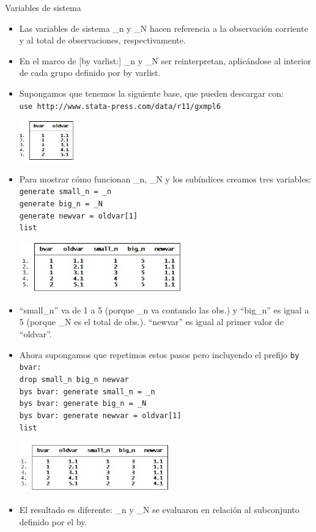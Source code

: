 \documentclass{beamer}
\begin{document}
\begin{frame}[allowframebreaks]{Variables de sistema}
\begin{itemize}
\item Las variables de sistema \_n y \_N hacen referencia a la observación corriente y al total de observaciones, respectivamente.
\item En el marco de [by varlist:] \_n y \_N ser reinterpretan, aplicándose al interior de cada grupo definido por by varlist.
\item Supongamos que tenemos la siguiente base, que pueden descargar con: \\{\footnotesize \texttt{use http://www.stata-press.com/data/r11/gxmpl6}}\\\smallskip
\centerline{\includegraphics[height=1.8cm]{graf1.jpg}}
\item Para mostrar cómo funcionan \_n, \_N y los subíndices creamos tres variables:\\\medskip
{\footnotesize
\texttt{generate small\_n = \_n}\\
\texttt{generate big\_n = \_N}\\
\texttt{generate newvar = oldvar[1]}\\
\texttt{list}}\\\medskip
\centerline{\includegraphics[height=2.2cm]{graf2.jpg}}
\item ``small\_n'' va de 1 a 5 (porque \_n va contando las obs.) y ``big\_n'' es igual a 5 (porque \_N es el total de obs.). ``newvar'' es igual al primer valor de ``oldvar''.
\item Ahora supongamos que repetimos estos pasos pero incluyendo el prefijo \texttt{by bvar:}\\\medskip
{\footnotesize
\texttt{drop small\_n big\_n newvar}\\
\texttt{bys bvar: generate small\_n = \_n}\\
\texttt{bys bvar: generate big\_n = \_N}\\
\texttt{bys bvar: generate newvar = oldvar[1]}\\
\texttt{list}}\\\medskip
\centerline{\includegraphics[height=2.2cm]{graf3.jpg}}
\item El resultado es diferente: \_n y \_N se evaluaron en relación al subconjunto definido por el by.
\end{itemize}
\end{frame}
\end{document}
